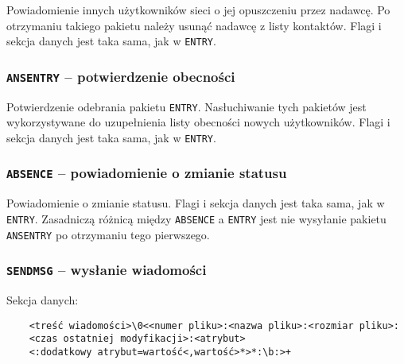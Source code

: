 \documentclass[11pt,leqno]{article}
\begin{document}
Powiadomienie innych użytkowników sieci o jej opuszczeniu przez nadawcę. Po otrzymaniu
takiego pakietu należy usunąć nadawcę z listy kontaktów. Flagi i sekcja danych jest
taka sama, jak w \texttt{ENTRY}.

\subsubsection{\textnormal{\texttt{ANSENTRY}} -- potwierdzenie obecności}

Potwierdzenie odebrania pakietu \texttt{ENTRY}. Nasłuchiwanie tych pakietów jest
wykorzystywane do uzupełnienia listy obecności nowych użytkowników.
Flagi i sekcja danych jest taka sama, jak w \texttt{ENTRY}.

\subsubsection{\textnormal{\texttt{ABSENCE}} -- powiadomienie o zmianie statusu}

Powiadomienie o zmianie statusu. Flagi i sekcja danych jest taka sama, jak w \texttt{ENTRY}.
Zasadniczą różnicą między \texttt{ABSENCE} a \texttt{ENTRY} jest nie wysyłanie pakietu
\texttt{ANSENTRY} po otrzymaniu tego pierwszego.


\subsubsection{\textnormal{\texttt{SENDMSG}} -- wysłanie wiadomości}\label{sec:sendMsg}

Sekcja danych:
\begin{verbatim}
	<treść wiadomości>\0<<numer pliku>:<nazwa pliku>:<rozmiar pliku>:
	<czas ostatniej modyfikacji>:<atrybut>
	<:dodatkowy atrybut=wartość<,wartość>*>*:\b:>+
\end{verbatim}
\end{document}
